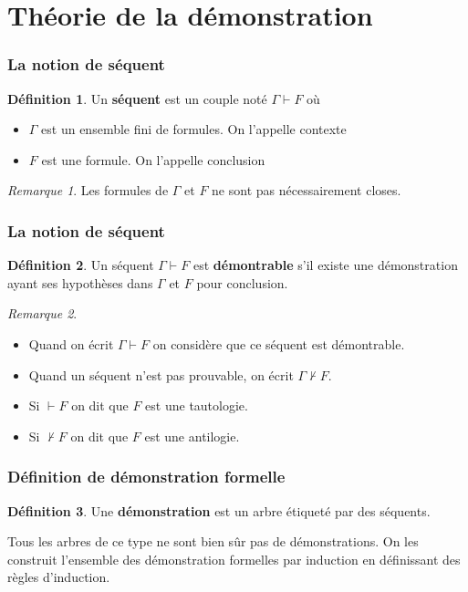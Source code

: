\documentclass[11pt,a4paper]{beamer}
\theoremstyle{plain}
\theoremstyle{definition}
\newtheorem{defn}{Définition}[section]
\theoremstyle{remark}
\newtheorem*{rem}{Remarque}
\begin{document}
\section{Théorie de la démonstration}
\begin{frame}
\frametitle{La notion de séquent}
\begin{defn}
Un \textbf{séquent} est un couple noté $\Gamma \vdash F$ où
\begin{itemize}
	\item $\Gamma$ est un ensemble fini de formules. On l'appelle contexte
	\item $F$ est une formule. On l'appelle conclusion
\end{itemize}
\end{defn}

\begin{rem}
Les formules de $\Gamma$ et $F$ ne sont pas nécessairement closes.
\end{rem}
\end{frame}

\begin{frame}
\frametitle{La notion de séquent}
\begin{defn}
Un séquent $\Gamma \vdash F$ est \textbf{démontrable} s'il existe une démonstration ayant ses hypothèses dans $\Gamma$ et $F$ pour conclusion.
\end{defn}

\begin{rem}
\begin{itemize}
	\item Quand on écrit $\Gamma \vdash F$ on considère que ce séquent est démontrable.
	\item Quand un séquent n'est pas prouvable, on écrit $\Gamma \nvdash F$.
	\item Si $\vdash F$ on dit que $F$ est une tautologie.
	\item Si $\nvdash F$ on dit que $F$ est une antilogie.
\end{itemize}
\end{rem}
\end{frame}

\begin{frame}
\frametitle{Définition de démonstration formelle}
\begin{defn}
Une \textbf{démonstration} est un arbre étiqueté par des séquents.

Tous les arbres de ce type ne sont bien sûr pas de démonstrations. On les construit l'ensemble des démonstration formelles par induction en définissant des règles d'induction.
\end{defn}
\end{frame}
\end{document}
